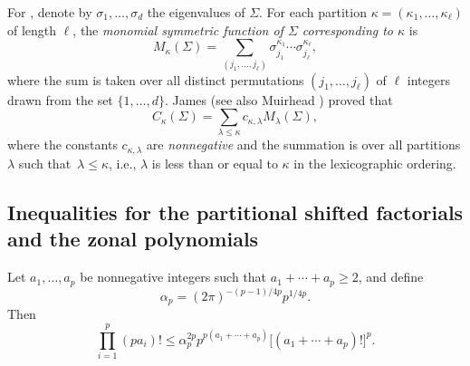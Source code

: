 For , denote by $\sigma_1,\ldots,\sigma_d$ the eigenvalues of $\Sigma$. For each partition $\kappa = (\kappa_1,\ldots,\kappa_\ell)$ of length $\ell$, the {\it monomial symmetric function of $\Sigma$ corresponding to $\kappa$} is
\begin{equation}
\label{eq_msf}
M_\kappa(\Sigma) = \sum_{(j_1,\ldots,j_\ell)} \sigma_{j_1}^{\kappa_1} \cdots \sigma_{j_\ell}^{\kappa_\ell},
\end{equation}
where the sum is taken over all distinct permutations $(j_1,\ldots,j_\ell)$ of $\ell$ integers drawn from the set $\{1,\ldots,d\}$. James \cite{James68} (see also Muirhead \cite[Section 7.2]{Muirhead}) proved that
\begin{equation}
\label{eq_zonal_msf}
C_\kappa(\Sigma) = \sum_{\lambda \le \kappa} c_{\kappa,\lambda} M_\lambda(\Sigma),
\end{equation}
where the constants $c_{\kappa,\lambda}$ are \textit{nonnegative} and the summation is over all partitions $\lambda$ such that~${\lambda \le \kappa}$, i.e., $\lambda$ is less than or equal to $\kappa$ in the lexicographic ordering.


\subsection[Inequalities for the partitional shifted factorials and the zonal polynomials]{Inequalities for the partitional shifted factorials\\ and the zonal polynomials}
\label{sec_ineqs}

\begin{Lemma}
\label{lemma_factorial_ineq}
Let $a_1,\ldots,a_p$ be nonnegative integers such that $a_1+\cdots+a_p\ge 2$, and define
\begin{equation}
\label{eq_alpha_p}
\alpha_p = (2\pi)^{-(p-1)/4p} p^{1/4p}.
\end{equation}
Then
\begin{equation}
\label{eq_prod_factorial_bound}
\prod_{i=1}^p (p a_i)! \le \alpha_p^{2p} p^{p(a_1+\cdots+a_p)} \bigl[(a_1+\cdots+a_p)!\bigr]^p.
\end{equation}
\end{Lemma}

